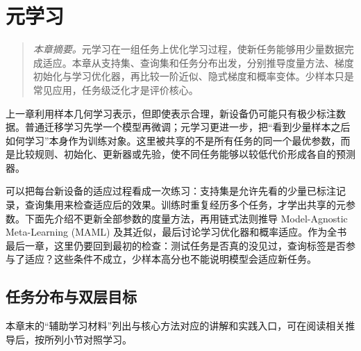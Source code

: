 ﻿\chapter{元学习}
\label{chap:meta}
\begin{quote}\small
\textit{本章摘要。}元学习在一组任务上优化学习过程，使新任务能够用少量数据完成适应。本章从支持集、查询集和任务分布出发，分别推导度量方法、梯度初始化与学习优化器，再比较一阶近似、隐式梯度和概率变体。少样本只是常见应用，任务级泛化才是评价核心。
\end{quote}

上一章利用样本几何学习表示，但即使表示合理，新设备仍可能只有极少标注数据。普通迁移学习先学一个模型再微调；元学习更进一步，把“看到少量样本之后如何学习”本身作为训练对象。这里被共享的不是所有任务的同一个最优参数，而是比较规则、初始化、更新器或先验，使不同任务能够以较低代价形成各自的预测器。

可以把每台新设备的适应过程看成一次练习：支持集是允许先看的少量已标注记录，查询集用来检查适应后的效果。训练时重复经历多个任务，才学出共享的元参数。下面先介绍不更新全部参数的度量方法，再用链式法则推导 Model-Agnostic Meta-Learning (MAML) 及其近似，最后讨论学习优化器和概率适应。作为全书最后一章，这里仍要回到最初的检查：测试任务是否真的没见过，查询标签是否参与了适应？这些条件不成立，少样本高分也不能说明模型会适应新任务。

\section{任务分布与双层目标}

本章末的“辅助学习材料”列出与核心方法对应的讲解和实践入口，可在阅读相关推导后，按所列小节对照学习。

